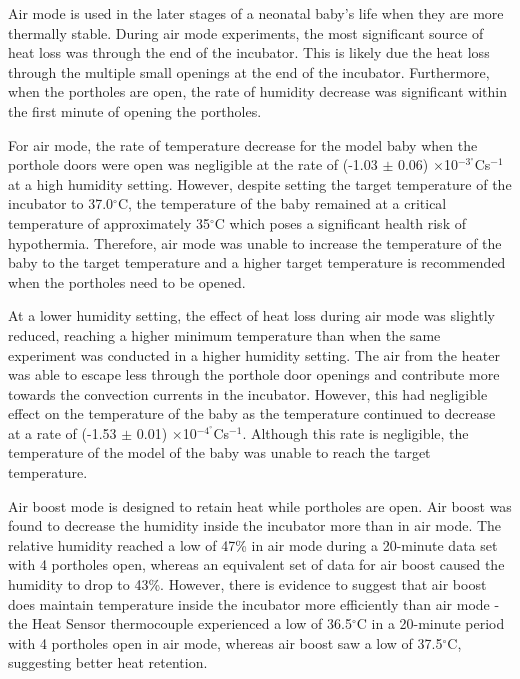 \documentclass{article}
\begin{document}
\vspace{3mm}

Air mode is used in the later stages of a neonatal baby’s life when they are more thermally stable. During air mode experiments, the most significant source of heat loss was through the end of the incubator. This is likely due the heat loss through the multiple small openings at the end of the incubator. Furthermore, when the portholes are open, the rate of humidity decrease was significant within the first minute of opening the portholes.  

 \vspace{3mm}

For air mode, the rate of temperature decrease for the model baby when the porthole doors were open was negligible at the rate of (-1.03 $\pm$ 0.06) $\times$10$^{-3}^{\circ}$Cs$^{-1}$ at a high humidity setting. However, despite setting the target temperature of the incubator to 37.0$^{\circ}$C, the temperature of the baby remained at a critical temperature of approximately 35$^{\circ}$C which poses a significant health risk of hypothermia. Therefore, air mode was unable to increase the temperature of the baby to the target temperature and a higher target temperature is recommended when the portholes need to be opened. 

 \vspace{3mm}

At a lower humidity setting, the effect of heat loss during air mode was slightly reduced, reaching a higher minimum temperature than when the same experiment was conducted in a higher humidity setting. The air from the heater was able to escape less through the porthole door openings and contribute more towards the convection currents in the incubator. However, this had negligible effect on the temperature of the baby as the temperature continued to decrease at a rate of (-1.53 $\pm$ 0.01) $\times$10$^{-4}^{\circ}$Cs$^{-1}$. Although this rate is negligible, the temperature of the model of the baby was unable to reach the target temperature. 

 \vspace{3mm}

Air boost mode is designed to retain heat while portholes are open. Air boost was found to decrease the humidity inside the incubator more than in air mode. The relative humidity reached a low of 47\% in air mode during a 20-minute data set with 4 portholes open, whereas an equivalent set of data for air boost caused the humidity to drop to 43\%. However, there is evidence to suggest that air boost does maintain temperature inside the incubator more efficiently than air mode - the Heat Sensor thermocouple experienced a low of 36.5$^{\circ}$C in a 20-minute period with 4 portholes open in air mode, whereas air boost saw a low of 37.5$^{\circ}$C, suggesting better heat retention. 
\end{document}
